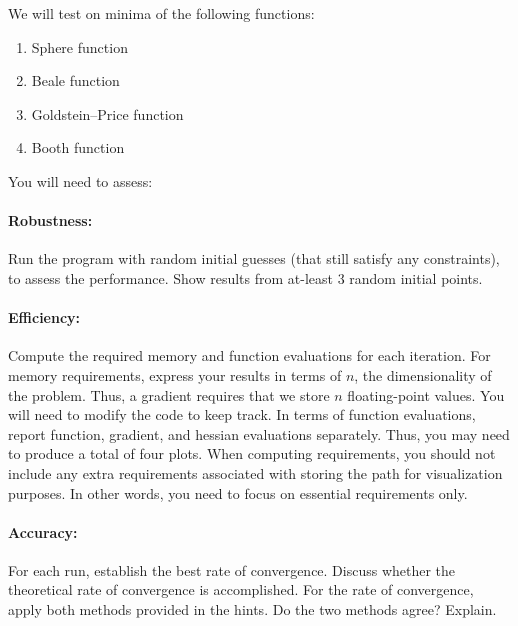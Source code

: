 \documentclass[11pt]{article}
\begin{document}
	We will test on minima of the following functions:
	\begin{enumerate}[label=\arabic*.]
		\item Sphere function
		\item Beale function
		\item Goldstein--Price function
		\item Booth function
	\end{enumerate}
	
	\noindent
	You will need to assess:
	
	\paragraph{Robustness:} Run the program with random initial guesses (that still satisfy any constraints), to assess the performance. Show results from at-least 3 random initial points.
	
	\paragraph{Efficiency:} Compute the required memory and function evaluations for each iteration. For memory requirements, express your results in terms of $n$, the dimensionality of the problem. Thus, a gradient requires that we store $n$ floating-point values. You will need to modify the code to keep track. In terms of function evaluations, report function, gradient, and hessian evaluations separately. Thus, you may need to produce a total of four plots. When computing requirements, you should not include any extra requirements associated with storing the path for visualization purposes. In other words, you need to focus on essential requirements only.
	
	\paragraph{Accuracy:} For each run, establish the best rate of convergence. Discuss whether the theoretical rate of convergence is accomplished. For the rate of convergence, apply both methods provided in the hints. Do the two methods agree? Explain.\\
\end{document}
